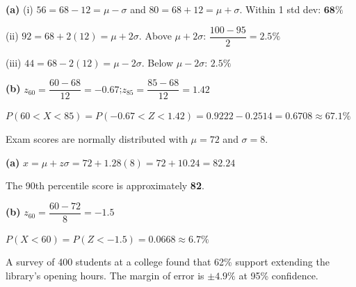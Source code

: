 \documentclass[addpoints]{exam}
\begin{document}
\begin{questions}
\begin{solution}[9cm]
\textbf{(a)}
(i) $56 = 68 - 12 = \mu - \sigma$ and $80 = 68 + 12 = \mu + \sigma$. Within 1 std dev: $\mathbf{68\%}$

(ii) $92 = 68 + 2(12) = \mu + 2\sigma$. Above $\mu + 2\sigma$: $\dfrac{100-95}{2} = \mathbf{2.5\%}$

(iii) $44 = 68 - 2(12) = \mu - 2\sigma$. Below $\mu - 2\sigma$: $\mathbf{2.5\%}$

\textbf{(b)} $z_{60} = \dfrac{60-68}{12} = -0.67$;\quad $z_{85} = \dfrac{85-68}{12} = 1.42$

$P(60 < X < 85) = P(-0.67 < Z < 1.42) = 0.9222 - 0.2514 = \mathbf{0.6708 \approx 67.1\%}$
\end{solution}

\question[5] Exam scores are normally distributed with $\mu = 72$ and $\sigma = 8$.
\begin{solution}[7cm]
\textbf{(a)} $x = \mu + z\sigma = 72 + 1.28(8) = 72 + 10.24 = \mathbf{82.24}$

The 90th percentile score is approximately \textbf{82}.

\textbf{(b)} $z_{60} = \dfrac{60-72}{8} = -1.5$

$P(X < 60) = P(Z < -1.5) = \mathbf{0.0668 \approx 6.7\%}$
\end{solution}

\question[8] A survey of 400 students at a college found that 62\% support extending the library's
opening hours. The margin of error is $\pm 4.9\%$ at 95\% confidence.
\end{questions}
\end{document}
